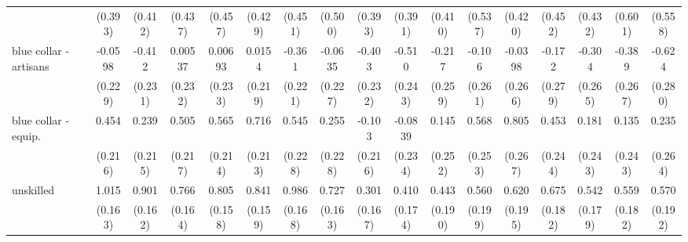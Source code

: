 {\begin{tabular}{l*{16}{c}}
                    &     (0.393)         &     (0.412)         &     (0.437)         &     (0.457)         &     (0.429)         &     (0.451)         &     (0.500)         &     (0.393)         &     (0.391)         &     (0.410)         &     (0.537)         &     (0.420)         &     (0.452)         &     (0.432)         &     (0.601)         &     (0.558)         \\
[1em]
blue collar - artisans&     -0.0598         &      -0.412         &     0.00537         &     0.00693         &      0.0154         &      -0.361         &     -0.0635         &      -0.403         &      -0.510\sym{*}  &      -0.217         &      -0.106         &     -0.0398         &      -0.172         &      -0.304         &      -0.389         &      -0.624\sym{*}  \\
                    &     (0.229)         &     (0.231)         &     (0.232)         &     (0.233)         &     (0.219)         &     (0.221)         &     (0.227)         &     (0.232)         &     (0.243)         &     (0.259)         &     (0.261)         &     (0.266)         &     (0.279)         &     (0.265)         &     (0.267)         &     (0.280)         \\
[1em]
blue collar - equip.&       0.454\sym{*}  &       0.239         &       0.505\sym{*}  &       0.565\sym{**} &       0.716\sym{***}&       0.545\sym{*}  &       0.255         &      -0.103         &     -0.0839         &       0.145         &       0.568\sym{*}  &       0.805\sym{**} &       0.453         &       0.181         &       0.135         &       0.235         \\
                    &     (0.216)         &     (0.215)         &     (0.217)         &     (0.214)         &     (0.213)         &     (0.228)         &     (0.228)         &     (0.216)         &     (0.234)         &     (0.252)         &     (0.253)         &     (0.267)         &     (0.244)         &     (0.243)         &     (0.243)         &     (0.264)         \\
[1em]
unskilled           &       1.015\sym{***}&       0.901\sym{***}&       0.766\sym{***}&       0.805\sym{***}&       0.841\sym{***}&       0.986\sym{***}&       0.727\sym{***}&       0.301         &       0.410\sym{*}  &       0.443\sym{*}  &       0.560\sym{**} &       0.620\sym{**} &       0.675\sym{***}&       0.542\sym{**} &       0.559\sym{**} &       0.570\sym{**} \\
                    &     (0.163)         &     (0.162)         &     (0.164)         &     (0.158)         &     (0.159)         &     (0.168)         &     (0.163)         &     (0.167)         &     (0.174)         &     (0.190)         &     (0.199)         &     (0.195)         &     (0.182)         &     (0.179)         &     (0.182)         &     (0.192)         \\

\end{tabular}}
